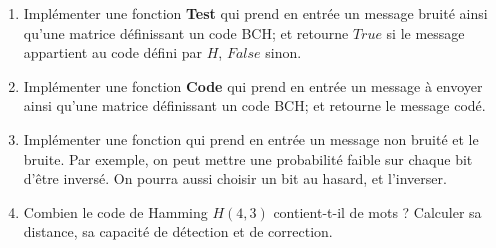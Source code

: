 \begin{enumerate}
\item Implémenter une fonction \textbf{Test} qui prend en entrée un message bruité ainsi qu'une matrice définissant un code BCH; et retourne $True$ si le message appartient au code défini par $H$, $False$ sinon.
\item Implémenter une fonction \textbf{Code} qui prend en entrée un message à envoyer ainsi qu'une matrice définissant un code BCH; et retourne le message codé.
\item Implémenter une fonction qui prend en entrée un message non bruité et le bruite. Par exemple, on peut mettre une probabilité faible sur chaque bit d'être inversé. On pourra aussi choisir un bit au hasard, et l'inverser.
\item Combien le code de Hamming $H(4,3)$ contient-t-il de mots ? Calculer sa distance, sa capacité de détection et de correction.
\end{enumerate}